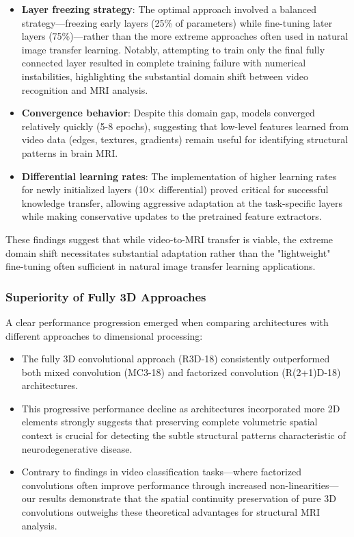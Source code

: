 \documentclass[12pt, a4paper]{article}
\begin{document}
\begin{itemize}
    \item \textbf{Layer freezing strategy}: The optimal approach involved a balanced strategy—freezing early layers (25\% of parameters) while fine-tuning later layers (75\%)—rather than the more extreme approaches often used in natural image transfer learning. Notably, attempting to train only the final fully connected layer resulted in complete training failure with numerical instabilities, highlighting the substantial domain shift between video recognition and MRI analysis.
    
    \item \textbf{Convergence behavior}: Despite this domain gap, models converged relatively quickly (5-8 epochs), suggesting that low-level features learned from video data (edges, textures, gradients) remain useful for identifying structural patterns in brain MRI.
    
    \item \textbf{Differential learning rates}: The implementation of higher learning rates for newly initialized layers (10× differential) proved critical for successful knowledge transfer, allowing aggressive adaptation at the task-specific layers while making conservative updates to the pretrained feature extractors.
\end{itemize}

These findings suggest that while video-to-MRI transfer is viable, the extreme domain shift necessitates substantial adaptation rather than the "lightweight" fine-tuning often sufficient in natural image transfer learning applications.

\subsubsection{Superiority of Fully 3D Approaches}

A clear performance progression emerged when comparing architectures with different approaches to dimensional processing:

\begin{itemize}
    \item The fully 3D convolutional approach (R3D-18) consistently outperformed both mixed convolution (MC3-18) and factorized convolution (R(2+1)D-18) architectures.
    
    \item This progressive performance decline as architectures incorporated more 2D elements strongly suggests that preserving complete volumetric spatial context is crucial for detecting the subtle structural patterns characteristic of neurodegenerative disease.
    
    \item Contrary to findings in video classification tasks—where factorized convolutions often improve performance through increased non-linearities—our results demonstrate that the spatial continuity preservation of pure 3D convolutions outweighs these theoretical advantages for structural MRI analysis.
\end{itemize}
\end{document}
